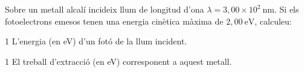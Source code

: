 Sobre un metall alcalí incideix llum de longitud d'ona $\lambda = 3,00\times 10^{2}\ \mathrm{nm}$. Si els fotoelectrons emesos tenen una energia cinètica màxima de $2,00\ \mathrm{eV}$, calculeu:

\begin{apartat}{1}
L'energia (en eV) d'un fotó de la llum incident.
\end{apartat}

\begin{apartat}{1}
El treball d'extracció (en eV) corresponent a aquest metall.
\end{apartat}

